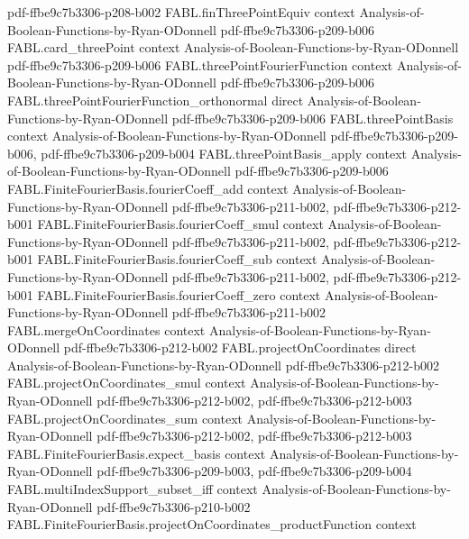 \begin{theorem}
  {pdf-ffbe9c7b3306-p208-b002}
\proofstep
  {FABL.finThreePointEquiv}
  {context}
  {Analysis-of-Boolean-Functions-by-Ryan-ODonnell}
  {pdf-ffbe9c7b3306-p209-b006}
\proofstep
  {FABL.card_threePoint}
  {context}
  {Analysis-of-Boolean-Functions-by-Ryan-ODonnell}
  {pdf-ffbe9c7b3306-p209-b006}
\proofstep
  {FABL.threePointFourierFunction}
  {context}
  {Analysis-of-Boolean-Functions-by-Ryan-ODonnell}
  {pdf-ffbe9c7b3306-p209-b006}
\proofstep
  {FABL.threePointFourierFunction_orthonormal}
  {direct}
  {Analysis-of-Boolean-Functions-by-Ryan-ODonnell}
  {pdf-ffbe9c7b3306-p209-b006}
\proofstep
  {FABL.threePointBasis}
  {context}
  {Analysis-of-Boolean-Functions-by-Ryan-ODonnell}
  {pdf-ffbe9c7b3306-p209-b006,
    pdf-ffbe9c7b3306-p209-b004}
\proofstep
  {FABL.threePointBasis_apply}
  {context}
  {Analysis-of-Boolean-Functions-by-Ryan-ODonnell}
  {pdf-ffbe9c7b3306-p209-b006}
\proofstep
  {FABL.FiniteFourierBasis.fourierCoeff_add}
  {context}
  {Analysis-of-Boolean-Functions-by-Ryan-ODonnell}
  {pdf-ffbe9c7b3306-p211-b002,
    pdf-ffbe9c7b3306-p212-b001}
\proofstep
  {FABL.FiniteFourierBasis.fourierCoeff_smul}
  {context}
  {Analysis-of-Boolean-Functions-by-Ryan-ODonnell}
  {pdf-ffbe9c7b3306-p211-b002,
    pdf-ffbe9c7b3306-p212-b001}
\proofstep
  {FABL.FiniteFourierBasis.fourierCoeff_sub}
  {context}
  {Analysis-of-Boolean-Functions-by-Ryan-ODonnell}
  {pdf-ffbe9c7b3306-p211-b002,
    pdf-ffbe9c7b3306-p212-b001}
\proofstep
  {FABL.FiniteFourierBasis.fourierCoeff_zero}
  {context}
  {Analysis-of-Boolean-Functions-by-Ryan-ODonnell}
  {pdf-ffbe9c7b3306-p211-b002}
\proofstep
  {FABL.mergeOnCoordinates}
  {context}
  {Analysis-of-Boolean-Functions-by-Ryan-ODonnell}
  {pdf-ffbe9c7b3306-p212-b002}
\proofstep
  {FABL.projectOnCoordinates}
  {direct}
  {Analysis-of-Boolean-Functions-by-Ryan-ODonnell}
  {pdf-ffbe9c7b3306-p212-b002}
\proofstep
  {FABL.projectOnCoordinates_smul}
  {context}
  {Analysis-of-Boolean-Functions-by-Ryan-ODonnell}
  {pdf-ffbe9c7b3306-p212-b002,
    pdf-ffbe9c7b3306-p212-b003}
\proofstep
  {FABL.projectOnCoordinates_sum}
  {context}
  {Analysis-of-Boolean-Functions-by-Ryan-ODonnell}
  {pdf-ffbe9c7b3306-p212-b002,
    pdf-ffbe9c7b3306-p212-b003}
\proofstep
  {FABL.FiniteFourierBasis.expect_basis}
  {context}
  {Analysis-of-Boolean-Functions-by-Ryan-ODonnell}
  {pdf-ffbe9c7b3306-p209-b003,
    pdf-ffbe9c7b3306-p209-b004}
\proofstep
  {FABL.multiIndexSupport_subset_iff}
  {context}
  {Analysis-of-Boolean-Functions-by-Ryan-ODonnell}
  {pdf-ffbe9c7b3306-p210-b002}
\proofstep
  {FABL.FiniteFourierBasis.projectOnCoordinates_productFunction}
  {context}

\end{theorem}
